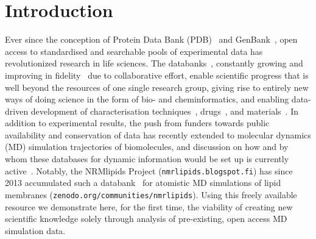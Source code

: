 \documentclass[journal=jpcbfk,manuscript=article,layout=twocolumn]{achemso}
\begin{document}
\section{Introduction}
Ever since the conception of Protein Data Bank (PDB)~\cite{nnb1971,wwPDB2019} and GenBank~\cite{jordan1982,sayers2020},
open access to standardised and searchable pools of experimental data has
revolutionized
research in life sciences.
The databanks~\cite{Gaber:2019a}, constantly growing and improving in fidelity~\cite{hobohm1992,levitt2007,meszaros2019}
due to collaborative effort, enable scientific progress that is well beyond the resources of one single research group, giving rise to entirely new ways of doing science in the form of bio- and cheminformatics, and enabling data-driven development of 
characterisation techniques~\cite{burley2018}, %
drugs~\cite{kirchmair08}, and materials~\cite{huang2016}.
%
%
In addition to experimental results, the push from %
funders towards public availability and conservation of data has recently extended to molecular dynamics (MD) simulation trajectories of biomolecules, and discussion on how and by whom these databases for dynamic information would be set up is currently active~\cite{Hildebrand:2019a,Abraham:2019a,Gygli:2020a,Abriata:2020a,Hospital:2020a}.
%
Notably, the NRMlipids Project ({\tt nmrlipids.blogspot.fi}) has since 2013 accumulated such a databank~\cite{Miettinen:2019c} for atomistic MD simulations of lipid membranes ({\tt zenodo.org/communities/nmrlipids}). Using this freely available resource we demonstrate here, for the first time, the viability of creating new scientific knowledge solely through analysis of pre-existing, open access MD simulation data.
\end{document}
